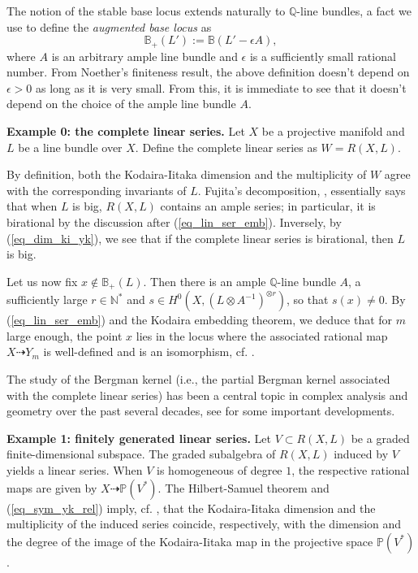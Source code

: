 \documentclass[12pt]{article}
\numberwithin{equation}{section}
\theoremstyle{theorem}
\theoremstyle{definition}
\theoremstyle{remark}
\newcommand{\nat}{\mathbb{N}}
\begin{document}
	The notion of the stable base locus extends naturally to $\mathbb{Q}$-line bundles, a fact we use to define the \textit{augmented base locus} as
	\begin{equation}\label{eq_aug_bl}
		\mathbb{B}_+(L') := \mathbb{B}(L' - \epsilon A),
	\end{equation}
	where $A$ is an arbitrary ample line bundle and $\epsilon$ is a sufficiently small rational number.
	From Noether's finiteness result, the above definition doesn't depend on $\epsilon > 0$ as long as it is very small.
	From this, it is immediate to see that it doesn't depend on the choice of the ample line bundle $A$.
	\par 
	\textbf{Example 0: the complete linear series.}
	Let $X$ be a projective manifold and $L$ be a line bundle over $X$. 
	Define the complete linear series as $W = R(X, L)$.
	\par 
	By definition, both the Kodaira-Iitaka dimension and the multiplicity of $W$ agree with the corresponding invariants of $L$.
	Fujita's decomposition, \cite[Corollary 2.2.7]{LazarBookI}, essentially says that when $L$ is big, $R(X, L)$ contains an ample series; in particular, it is birational by the discussion after (\ref{eq_lin_ser_emb}).
	Inversely, by (\ref{eq_dim_ki_yk}), we see that if the complete linear series is birational, then $L$ is big.
	\par 
	Let us now fix $x \not\in \mathbb{B}_+(L)$.
	Then there is an ample $\mathbb{Q}$-line bundle $A$, a sufficiently large $r \in \nat^*$ and $s \in H^0(X, (L \otimes A^{-1})^{\otimes r})$, so that $s(x) \neq 0$.
	By (\ref{eq_lin_ser_emb}) and the Kodaira embedding theorem, we deduce that for $m$ large enough, the point $x$ lies in the locus where the associated rational map $X \dashrightarrow Y_m$ is well-defined and is an isomorphism, cf. \cite[Lemma 2.16]{LazMus}.
	\par 
	The study of the Bergman kernel (i.e., the partial Bergman kernel associated with the complete linear series) has been a central topic in complex analysis and geometry over the past several decades, see \cite{TianBerg, ZeldBerg, Bouche, Caltin, DaiLiuMa, MaHol, BermanEnvProj, ComanMaMarMoish} for some important developments.
	\par 
	\textbf{Example 1: finitely generated linear series.}
	Let $V \subset R(X, L)$ be a graded finite-dimensional subspace. 
	The graded subalgebra of $R(X, L)$ induced by $V$ yields a linear series.
	When $V$ is homogeneous of degree $1$, the respective rational maps are given by $X \dashrightarrow \mathbb{P}(V^*)$. The Hilbert-Samuel theorem and (\ref{eq_sym_yk_rel}) imply, cf. \cite[Theorem 3.1]{KavehKhov}, that the Kodaira-Iitaka dimension and the multiplicity of the induced series coincide, respectively, with the dimension and the degree of the image of the Kodaira-Iitaka map in the projective space $\mathbb{P}(V^*)$.
\end{document}

